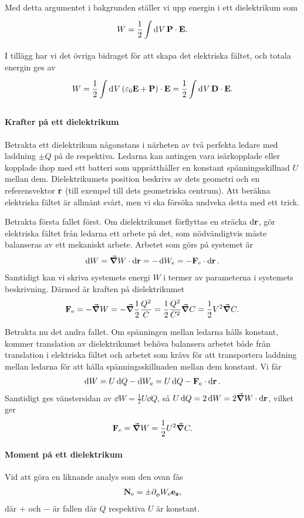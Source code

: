 Med detta argumentet i bakgrunden ställer vi upp energin i ett dielektrikum som
\begin{align*}
	W = \frac{1}{2}\int\limits_{}^{}\dd[]{V}\vb{P}\cdot\vb{E}.
\end{align*}
I tillägg har vi det övriga bidraget för att skapa det elektriska fältet, och totala energin ges av
\begin{align*}
	W = \frac{1}{2}\int\limits_{}^{}\dd[]{V}(\varepsilon_{0}\vb{E} + \vb{P})\cdot\vb{E} = \frac{1}{2}\int\limits_{}^{}\dd[]{V}\vb{D}\cdot\vb{E}.
\end{align*}


\paragraph{Krafter på ett dielektrikum}
Betrakta ett dielektrikum någonstans i närheten av två perfekta ledare med laddning $\pm Q$ på de respektiva. Ledarna kan antingen vara isärkopplade eller kopplade ihop med ett batteri som upprätthåller en konstant spänningsskillnad $U$ mellan dem. Dielektrikumets position beskrivs av dets geometri och en referensvektor $\vb{r}$ (till exempel till dets geometriska centrum). Att beräkna elektriska fältet är allmänt svårt, men vi ska försöka undveka detta med ett trick.

Betrakta första fallet först. Om dielektrikumet förflyttas en sträcka $\dd{\vb{r}}$, gör elektriska fältet från ledarna ett arbete på det, som nödvändigtvis måste balanseras av ett mekaniskt arbete. Arbetet som görs på systemet är
\begin{align*}
	\dd{W} = \grad{W}\cdot\dd{\vb{r}} = -\dd{W_{\text{e}}} = -\vb{F}_{\text{e}}\cdot\dd{\vb{r}}.
\end{align*}
Samtidigt kan vi skriva systemets energi $W$ i termer av parameterna i systemets beskrivning. Därmed är kraften på dielektrikumet
\begin{align*}
	\vb{F}_{\text{e}} = -\grad{W} = -\grad{\frac{1}{2}\frac{Q^{2}}{C}} = \frac{1}{2}\frac{Q^{2}}{C^{2}}\grad{C} = \frac{1}{2}V^{2}\grad{C}.
\end{align*}

Betrakta nu det andra fallet. Om spänningen mellan ledarna hålls konstant, kommer translation av dielektrikumet behöva balansera arbetet både från translation i elektriska fältet och arbetet som krävs för att transportera laddning mellan ledarna för att hålla spänningsskillnaden mellan dem konstant. Vi får 
\begin{align*}
	\dd{W} = U\dd{Q} - \dd{W_{\text{e}}} = U\dd{Q} - \vb{F}_{\text{e}}\cdot\dd{\vb{r}}.
\end{align*}
Samtidigt ges vänstersidan av $\dd{W} = \frac{1}{2}U\dd{Q}$, så $U\dd{Q} = 2\dd{W} = 2\grad{W}\cdot\dd{\vb{r}}$, vilket ger
\begin{align*}
	\vb{F}_{\text{e}} = \grad{W} = \frac{1}{2}U^{2}\grad{C}.
\end{align*}

\paragraph{Moment på ett dielektrikum}
Vid att göra en liknande analys som den ovan fås
\begin{align*}
	\vb{N}_{\text{e}} = \pm\partial_{\phi}^{}W_{\text{e}}\vb{e}_{\vb{z}},
\end{align*}
där $+$ och $-$ är fallen där $Q$ respektiva $U$ är konstant.